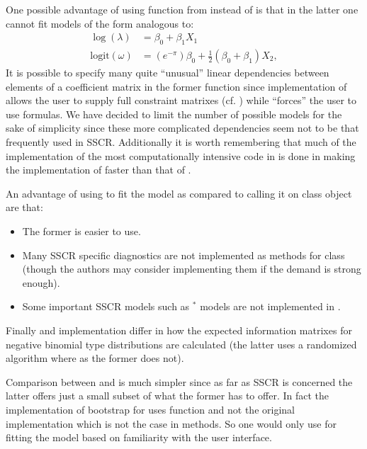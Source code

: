 \documentclass[
]{jss}
\newcommand{\1}{\mathcal{I}} \newcommand{\bZero}{\boldsymbol{0}}
\begin{document}
One possible advantage of using  function from 
instead of  is that in the latter one cannot fit
models of the form analogous to: \begin{align*}
  \log(\lambda)         &= \beta_{0} + \beta_{1}X_{1}\\
  \text{logit}(\omega)  &= (e^{-\pi})\beta_{0} + \frac{1}{2}(\beta_{0}+\beta_{1})X_{2},
\end{align*} It is possible to specify many quite ``unusual'' linear
dependencies between elements of a coefficient matrix in the former
function since implementation of  allows the user to supply
full constraint matrixes (cf. \citet{yee2015vgam}) while
 ``forces'' the user to use formulas. We have
decided to limit the number of possible models for the sake of
simplicity since these more complicated dependencies seem not to be that
frequently used in SSCR. Additionally it is worth remembering that much
of the implementation of the most computationally intensive code in
 is done in  making the implementation of
 faster than that of .

An advantage of using  to fit the model as
compared to calling it on  class object are that:

\begin{itemize}
  \item The former is easier to use.
  \item Many SSCR specific diagnostics are not implemented as methods for  class (though the authors may consider implementing them if the demand is strong enough).
  \item Some important SSCR models such as $^{\ast}$ models are not implemented in .
\end{itemize}

Finally  and  implementation differ in how
the expected information matrixes for negative binomial type
distributions are calculated (the latter uses a randomized algorithm
where as the former does not).

Comparison between  and  is much
simpler since as far as SSCR is concerned the latter offers just a small
subset of what the former has to offer. In fact the implementation of
bootstrap for  uses  function
and not the original implementation which is not the case in
 methods. So one would only use  for
fitting the model based on familiarity with the user interface.
\end{document}
